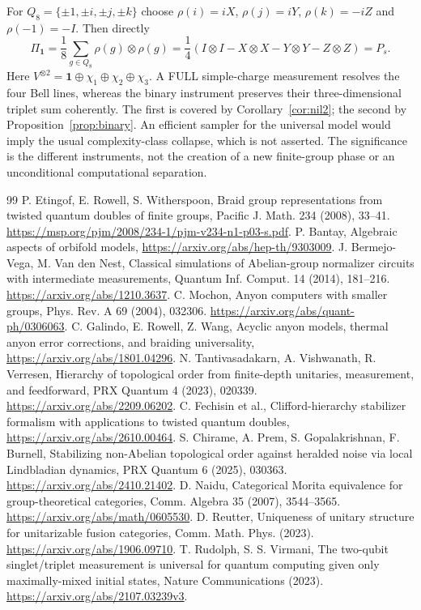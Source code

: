 \documentclass[11pt]{amsart}
\theoremstyle{definition}\newtheorem{definition}[theorem]{Definition}
\newcommand{\one}{\mathbf1}
\begin{document}
For $Q_8=\{\pm1,\pm i,\pm j,\pm k\}$ choose
$\rho(i)=iX$, $\rho(j)=iY$, $\rho(k)=-iZ$ and $\rho(-1)=-I$.
Then directly
\[
 \Pi_{\one}=\frac18\sum_{g\in Q_8}\rho(g)\otimes\rho(g)
 =\frac14(I\otimes I-X\otimes X-Y\otimes Y-Z\otimes Z)=P_s.
\]
Here $V^{\otimes2}=\one\oplus\chi_1\oplus\chi_2\oplus\chi_3$.
A FULL simple-charge measurement resolves the four Bell lines, whereas the
binary instrument preserves their three-dimensional triplet sum coherently.
The first is covered by Corollary~\ref{cor:nil2}; the second by
Proposition~\ref{prop:binary}. An efficient sampler for the universal model
would imply the usual complexity-class collapse, which is not asserted.
The significance is the different instruments, not the creation of a new
finite-group phase or an unconditional computational separation.

\begin{thebibliography}{99}
 P. Etingof, E. Rowell, S. Witherspoon, Braid group representations
from twisted quantum doubles of finite groups, Pacific J. Math. 234 (2008), 33--41.
\url{https://msp.org/pjm/2008/234-1/pjm-v234-n1-p03-s.pdf}.
 P. Bantay, Algebraic aspects of orbifold models,
\url{https://arxiv.org/abs/hep-th/9303009}.
 J. Bermejo-Vega, M. Van den Nest, Classical simulations of
Abelian-group normalizer circuits with intermediate measurements,
Quantum Inf. Comput. 14 (2014), 181--216.
\url{https://arxiv.org/abs/1210.3637}.
 C. Mochon, Anyon computers with smaller groups,
Phys. Rev. A 69 (2004), 032306. \url{https://arxiv.org/abs/quant-ph/0306063}.
 C. Galindo, E. Rowell, Z. Wang, Acyclic anyon models,
thermal anyon error corrections, and braiding universality,
\url{https://arxiv.org/abs/1801.04296}.
 N. Tantivasadakarn, A. Vishwanath, R. Verresen,
Hierarchy of topological order from finite-depth unitaries, measurement,
and feedforward, PRX Quantum 4 (2023), 020339.
\url{https://arxiv.org/abs/2209.06202}.
 C. Fechisin et al., Clifford-hierarchy stabilizer formalism
with applications to twisted quantum doubles,
\url{https://arxiv.org/abs/2610.00464}.
 S. Chirame, A. Prem, S. Gopalakrishnan, F. Burnell,
Stabilizing non-Abelian topological order against heralded noise via local
Lindbladian dynamics, PRX Quantum 6 (2025), 030363.
\url{https://arxiv.org/abs/2410.21402}.
 D. Naidu, Categorical Morita equivalence for group-theoretical
categories, Comm. Algebra 35 (2007), 3544--3565.
\url{https://arxiv.org/abs/math/0605530}.
 D. Reutter, Uniqueness of unitary structure for unitarizable
fusion categories, Comm. Math. Phys. (2023).
\url{https://arxiv.org/abs/1906.09710}.
 T. Rudolph, S. S. Virmani, The two-qubit singlet/triplet
measurement is universal for quantum computing given only maximally-mixed
initial states, Nature Communications (2023).
\url{https://arxiv.org/abs/2107.03239v3}.
\end{thebibliography}
\end{document}
